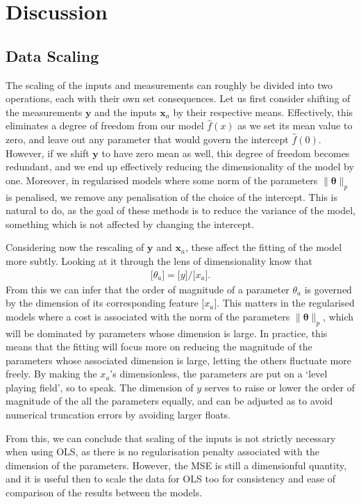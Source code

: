 \documentclass[twocolumn,english,notitlepage]{article}
\renewcommand{\vec}[1]{\boldsymbol{#1}}
\renewcommand{\norm}[2][]{\ensuremath{\|#2\|_{#1}}}
\newcommand{\dimof}[1]{\bigl[#1\bigr]}
\begin{document}
\section{Discussion}
    \subsection{Data Scaling}
        The scaling of the inputs and measurements can roughly be divided into two operations, each with their own set consequences. Let us first consider shifting of the measurements $\vec{y}$ and the inputs $\vec{x}_a$ by their respective means. Effectively, this eliminates a degree of freedom from our model $\hat{f}(x)$ as we set its mean value to zero, and leave out any parameter that would govern the intercept $\hat{f}(0)$. However, if we shift $\vec{y}$ to have zero mean as well, this degree of freedom becomes redundant, and we end up effectively reducing the dimensionality of the model by one. Moreover, in regularised models where some norm of the parameters $\norm[p]{\vec{\theta}}$ is penalised, we remove any penalisation of the choice of the intercept. This is natural to do, as the goal of these methods is to reduce the variance of the model, something which is not affected by changing the intercept.

        Considering now the rescaling of $\vec{y}$ and $\vec{x}_a$, these affect the fitting of the model more subtly. Looking at it through the lens of dimensionality know that
        \begin{align}
            \dimof{\theta_a} = \dimof{y} / \dimof{x_a}.
        \end{align}
        From this we can infer that the order of magnitude of a parameter $\theta_a$ is governed by the dimension of its corresponding feature $\dimof{x_a}$. This matters in the regularised models where a cost is associated with the norm of the parameters $\norm[p]{\vec{\theta}}$, which will be dominated by parameters whose dimension is large. In practice, this means that the fitting will focus more on reducing the magnitude of the parameters whose associated dimension is large, letting the others fluctuate more freely. By making the $x_a$'s dimensionless, the parameters are put on a `level playing field', so to speak. The dimension of $y$ serves to raise or lower the order of magnitude of the all the parameters equally, and can be adjusted as to avoid numerical truncation errors by avoiding larger floats.

        From this, we can conclude that scaling of the inputs is not strictly necessary when using OLS, as there is no regularisation penalty associated with the dimension of the parameters. However, the MSE is still a dimensionful quantity, and it is useful then to scale the data for OLS too for consistency and ease of comparison of the results between the models.
\end{document}
